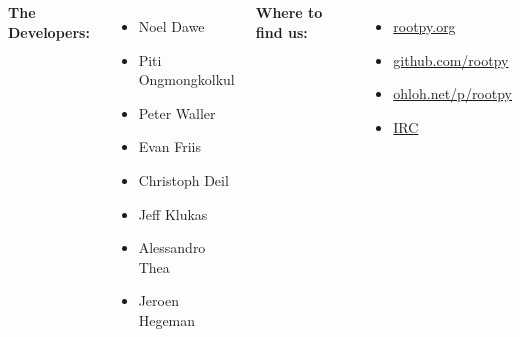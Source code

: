 \documentclass[10pt,professionalfonts,serif,usenames,dvipsnames,svgnames,table]{beamer}
\begin{document}
\begin{frame}
    \begin{large}
    \begin{center}
    \begin{columns}
{\bf The Developers:}
\vspace{.5cm}
\begin{itemize}
    \item Noel Dawe
    \item Piti Ongmongkolkul
    \item Peter Waller
    \item Evan Friis
    \item Christoph Deil
    \item Jeff Klukas
    \item Alessandro Thea
    \item Jeroen Hegeman
\end{itemize}
{\bf Where to find us:}
\vspace{.5cm}
        \begin{itemize}
            \item \href{http://rootpy.org}{rootpy.org}
            \item \href{https://github.com/rootpy}{github.com/rootpy}
            \item \href{http://www.ohloh.net/p/rootpy}{ohloh.net/p/rootpy}
            \item \href{http://webchat.freenode.net/?randomnick=1&channels=rootpy&prompt=1}{IRC}
            \end{itemize}
        \end{columns}
    \end{center}
    \end{large}
\end{frame}
\end{document}
